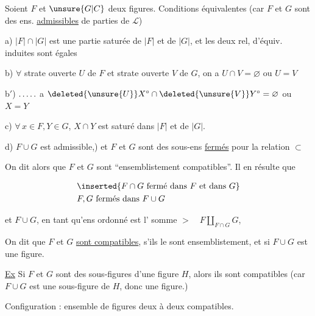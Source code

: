 Soient $F$ et $\unsure{G|C}$ deux figures. Conditions équivalentes (car $F$ et $G$ sont des ens. \uline{admissibles} de parties de $\mathcal{L}$)

a) $|F|\cap|G|$ est une partie saturée de $|F|$ et de $|G|$, et les deux rel, d'équiv. induites sont égales


b) $\forall$ strate ouverte $U$ de $F$ et strate ouverte $V$ de $G$, on a $U\cap V=\varnothing$ ou $U=V$

b$'$) $\ldotp\ldotp\ldotp\ldotp\ldotp$  a $\deleted{\unsure{U}}X^\circ\cap\deleted{\unsure{V}}Y^\circ=\varnothing$ ou $X=Y$

c) $\forall\,x\in F,Y\in G$, $X\cap Y$ est saturé dans $|F|$ et de $|G|$. 

d) $F\cup G$ est admissible,) et $F$ et $G$ sont des sous-ens  \uline{fermés} pour la relation $\subset$

On dit alors que  $F$ et $G$ sont ``ensemblistement compatibles''. Il en résulte que

\[
\begin{aligned}
&\relax\inserted{F\cap G\ \text{fermé dans } F \text{ et dans } G}\\
&F,G\ \text{fermés dans } F\cup G
\end{aligned}
\]

et $F\cup G$, en tant qu'ens  ordonné est l'  somme  $>\quad F\amalg_{F\cap G}G$,


On dit que $F$ et $G$ \uline{sont compatibles},  s'ils le sont ensemblistement, et si $F\cup G$ est une figure. 

\uline{Ex} Si $F$ et $G$ sont des sous-figures d'une figure $H$, alors ils sont compatibles (car  $F\cup G$ est une sous-figure de $H$, donc une figure.)

Configuration : ensemble de figures deux à deux compatibles.
